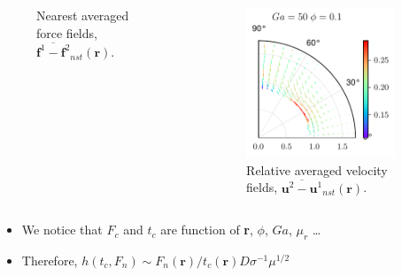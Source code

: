 \documentclass{sintefbeamer}
\newcommand{\nstavg}[1]{\overline{#1}_{nst}}
\begin{document}
\begin{frame}
\begin{columns}
\begin{columns}
\begin{figure}
        \caption{Nearest averaged force fields, $\nstavg{\textbf{f}^1 - \textbf{f}^2}(\textbf{r})$.}
      \end{figure}
      \centering
      \begin{figure}
      \includegraphics[width=0.9\textwidth]{image/HOMOGENEOUS/fDrop/U_mu_r_0_1_Ga_50_PHI_0_1.pdf}
      \caption{Relative averaged velocity fields, $\nstavg{\textbf{u}^2 - \textbf{u}^1}(\textbf{r})$.}
    \end{figure}
    \end{columns}
  \end{columns}
  \begin{itemize}
    \item We notice that $F_c$ and $t_c$ are function of \textbf{r}, $\phi$, $Ga$, $\mu_r$ \ldots
    \item Therefore,
    $ h(t_c,F_n)  \sim F_n(\textbf{r}) / t_c(\textbf{r}) D \sigma^{-1} \mu^{1/2}$
  \end{itemize}
\end{frame}
\end{document}
